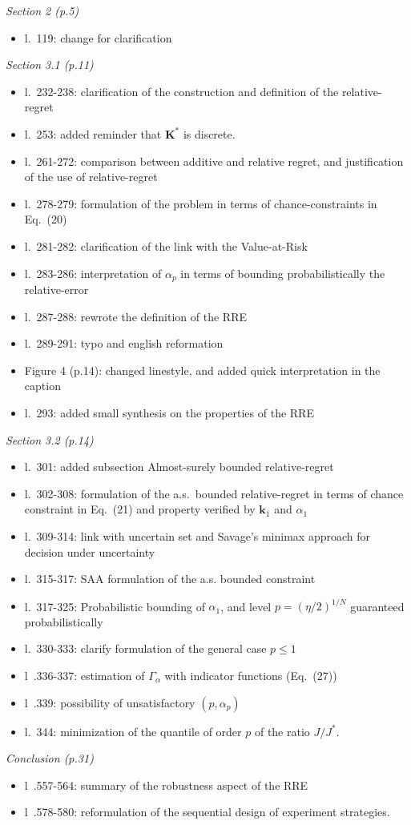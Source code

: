 \documentclass[a4paper,11pt]{article}
\begin{document}
\emph{Section 2 (p.5)}
\begin{itemize}
\item l.~119: change for clarification
\end{itemize}
\emph{Section 3.1 (p.11)}
\begin{itemize}
\item l.~232-238: clarification of the construction and definition of the relative-regret 
\item l.~253: added reminder that $\mathbf{K}^*$ is discrete.
\item l.~261-272: comparison between additive and relative regret, and justification of the use of relative-regret
\item l.~278-279: formulation of the problem in terms of chance-constraints in Eq.~(20)
\item l.~281-282: clarification of the link with the Value-at-Risk 
\item l.~283-286: interpretation of $\alpha_p$ in terms of bounding probabilistically the relative-error
\item l.~287-288: rewrote the definition of the RRE
\item l.~289-291: typo and english reformation
\item Figure 4 (p.14): changed linestyle, and added quick interpretation in the caption 
\item l.~293: added small synthesis on the properties of the RRE
\end{itemize}
\emph{Section 3.2 (p.14)}
  \begin{itemize}
\item l.~301: added subsection Almost-surely bounded relative-regret
\item l.~302-308: formulation of the a.s.\ bounded relative-regret in terms of chance constraint in Eq.~(21) and property verified by $\mathbf{k}_1$ and $\alpha_1$
\item l.~309-314: link with uncertain set and Savage's minimax approach for decision under uncertainty
\item l.~315-317: SAA formulation of the a.s. bounded constraint
\item l.~317-325: Probabilistic bounding of $\alpha_1$, and level $p=(\eta/2)^{1/N}$ guaranteed probabilistically
\item l.~330-333: clarify formulation of the general case $p \leq 1$
\item l~.336-337: estimation of $\Gamma_\alpha$ with indicator functions (Eq.~(27))
\item l~.339: possibility of unsatisfactory $(p, \alpha_p)$
\item l.~344: minimization of the quantile of order $p$ of the ratio $J / J^*$.
\end{itemize}
 \emph{Conclusion (p.31)}
\begin{itemize}
\item l~.557-564: summary of the robustness aspect of the RRE
\item l~.578-580: reformulation of the sequential design of experiment strategies.
\end{itemize}
\end{document}
